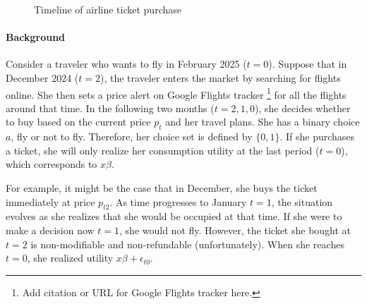 \documentclass[12pt]{article}
\begin{document}
\begin{figure}[h!]
    \centering

    \caption{Timeline of airline ticket purchase}
    \label{fig:toy_model}
\end{figure}

\paragraph{Background} Consider a traveler who wants to fly in February 2025 (\(t=0\)). Suppose that
in December 2024 (\(t=2\)), the traveler enters the market by searching for
flights online. She then sets a price alert on Google Flights tracker
\footnote{Add citation or URL for Google Flights tracker here.} for all the
flights around that time. In the following two months (\(t = 2, 1,0\)), she
decides whether to buy based on the current price \(p_t\) and her travel plans.
She has a binary choice $a$, fly or not to fly. Therefore, her choice set is
defined by \(\{0,1\}\). If she purchases a ticket, she will only realize her
consumption utility at the last period (\(t=0\)), which corresponds to
\(x\beta\).

For example, it might be the case that in December, she buys the ticket
immediately at price \(p_{t2}\). As time progresses to January $t=1$, the
situation evolves as she realizes that she would be occupied at that time. If
she were to make a decision now $t=1$, she would not fly. However, the ticket
she bought at $t=2$ is non-modifiable and non-refundable (unfortunately). When
she reaches \(t=0\), she realized utility $x\beta+\epsilon_{t0}$.
\end{document}
